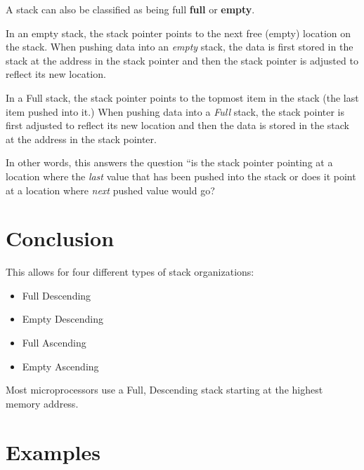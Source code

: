 \documentclass[10pt,letterpaper]{article}
\begin{document}
A stack can also be classified as being full \textbf{full} or \textbf{empty}.

In an empty stack, the stack pointer points to the next free (empty) 
location on the stack.  
When pushing data into an {\em empty} stack, the data is first stored in 
the stack at the address in the stack pointer and then the stack pointer 
is adjusted to reflect its new location.

In a Full stack, the stack pointer points to the topmost item in the stack
(the last item pushed into it.)
When pushing data into a {\em Full} stack, 
the stack pointer is first adjusted to reflect its new location and then
the data is stored in the stack at the address in the stack pointer.

In other words, this answers the question ``is the stack pointer
pointing at a location where the {\em last} value that has been pushed into 
the stack or does it point at a location where {\em next} pushed value 
would go?




\section{Conclusion}

This allows for four different types of stack organizations:

\begin{itemize}
\item Full Descending
\item Empty Descending
\item Full Ascending
\item Empty Ascending
\end{itemize}

Most microprocessors use a Full, Descending stack starting at the 
highest memory address.








\section{Examples}
\end{document}
